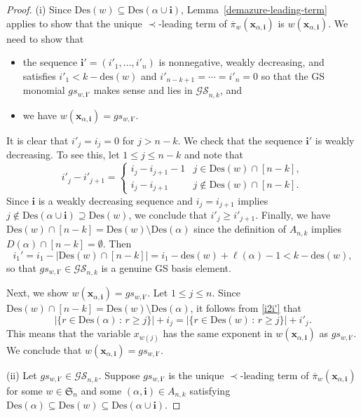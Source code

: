 \documentclass[ALCO,ThmDefs,published]{cedram}
\newcommand{\symm}{{\mathfrak{S}}}
\newcommand{\xx}{{\mathbf {x}}}
\theoremstyle{plain}
\newcommand{\Des}{{\mathrm {Des}}}
\newcommand{\des}{{\mathrm {des}}}
\newcommand{\symm}{{\mathfrak{S}}}
\newcommand{\GS}{{\mathcal{GS}}}
\newcommand{\xx}{{\mathbf {x}}}
\newcommand{\ii}{{\mathbf{i}}}
\newcommand{\pib}{\overline{\pi}}
\begin{document}
\begin{proof}
(i)  Since $\Des(w) \subseteq \Des(\alpha \cup \ii)$,
Lemma~\ref{demazure-leading-term} applies to show that the unique $\prec$-leading term of 
$\pib_w(\xx_{\alpha,\ii})$ is $w(\xx_{\alpha,\ii})$.  
We need to show that
\begin{itemize}
\item
the sequence $\ii' = (i'_1, \dots, i'_n)$ is nonnegative, 
weakly decreasing, and satisfies $i'_1 < k - \des(w)$ and $i'_{n-k+1} = \cdots = i'_n = 0$
so that the GS monomial $gs_{w,\ii'}$ makes sense and lies in $\GS_{n,k}$, and
\item we have $w(\xx_{\alpha,\ii}) = gs_{w,\ii'}$.
\end{itemize}


It is clear that $i'_j = i_j = 0$ for $j > n-k$.
We check that the sequence $\ii'$ is weakly decreasing.  To see this,  let $1 \leq j \leq n-k$ and
note that 
\begin{equation}
i'_j - i'_{j+1} = \begin{cases}
i_j - i_{j+1} - 1 & j \in \Des(w)\cap[n-k], \\
i_j - i_{j+1} & j \notin \Des(w)\cap[n-k].
\end{cases}
\end{equation}
Since $\ii$ is a weakly decreasing sequence and $i_j = i_{j+1}$ implies
$j \notin \Des(\alpha \cup \ii) \supseteq \Des(w)$, we conclude that $i'_j \geq i'_{j+1}$.
Finally, we have $\Des(w)\cap[n-k] = \Des(w)\setminus\Des(\alpha)$ since the definition of $A_{n,k}$ implies $D(\alpha)\cap[n-k]=\emptyset$.
Then
\begin{equation}
i_1' = i_1 - | \Des(w)\cap[n-k] | = i_1 - \des(w) + \ell(\alpha) -1 < k - \des(w),
\end{equation}
so that $gs_{w,\ii'} \in \GS_{n,k}$ is a genuine GS basis element.

Next, we show $w(\xx_{\alpha,\ii}) = gs_{w,\ii'}$.
Let $1 \leq j \leq n$. Since $\Des(w)\cap[n-k] = \Des(w)\setminus\Des(\alpha)$, it follows from \eqref{i2i'} that
\begin{equation}
| \{r \in \Des(\alpha) \,:\, r \geq j \}| + i_j = |\{ r \in \Des(w) \,:\, r \geq j \}| + i'_j.
\end{equation}
This means that the variable $x_{w(j)}$ has the same exponent in $w(\xx_{\alpha,\ii})$
as $gs_{w,\ii'}$.   We conclude that $w(\xx_{\alpha,\ii}) = gs_{w,\ii'}$.

(ii)  Let $gs_{w,\ii'} \in \GS_{n,k}$.  Suppose $gs_{w,\ii'}$ is the unique $\prec$-leading term of 
$\pib_w(\xx_{\alpha,\ii})$ for some $w\in\symm_n$ and some $(\alpha,\ii) \in A_{n,k}$ satisfying
$\Des(\alpha) \subseteq \Des(w) \subseteq \Des(\alpha \cup \ii)$. 


\end{proof}
\end{document}
